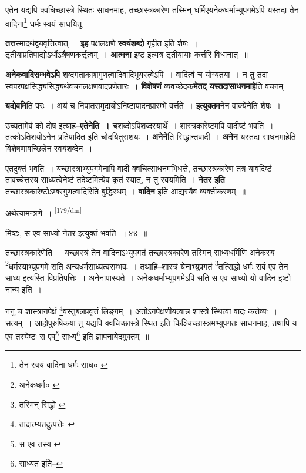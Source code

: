 \documentclass[article,12pt,a4paper]{memoir}
\begin{document}
	  \pstart एतेन यद्यपि क्वचिच्छास्त्रे स्थितः साधनमाह, तच्छास्त्रकारेण तस्मिन् धर्मिएयनेकधर्माभ्युपगमेऽपि यस्तदा तेन वादिना\footnote{तेन स्वयं वादिना धर्मः साध० \cite{dp-msC}} धर्मः स्वयं साधयितु-
	\pend
      

	  \pstart \textbf{तत्त}स्मादर्थद्वयवृत्तित्वात् । \textbf{इह} पक्षलक्षणे \textbf{स्वयंशब्दो} गृहीत इति शेषः । तृतीयाप्रतिपाद्योऽर्थोऽत्रैषणकर्त्तृत्वम् । \textbf{आत्मना} इष्ट इत्यत्र तृतीयायाः कर्त्तरि विधानात् ॥
	\pend
      

	  \pstart \textbf{अनेकवादिसम्भवेऽपि} शब्दगताकाशगुणत्वादिवादिभूयस्त्वेऽपि । वादित्वं च योग्यतया । न तु तदा स्वपरपक्षसिद्ध्यसिद्ध्यर्थवचनलक्षणवादप्रणेतारः । \textbf{विशेषणं} व्यवच्छेदक\textbf{मेतद् यस्तदासाधनमाहे}ति वचनम् ।
	\pend
      

	  \pstart \textbf{यद्येवमि}ति परः । अयं च निपातसमुदायोऽनिष्टापादनप्रारम्भे वर्त्तते । \textbf{इत्युक्तम}नेन वाक्येनेति शेषः ।
	\pend
      

	  \pstart उच्यतामेवं को दोष इत्याह--\textbf{एतेनेति । च}शब्दोऽपिशब्दस्यार्थे । शास्त्रकारेष्टमपि वादीष्टं भवति । तत्कोऽतिशयोऽनेन प्रतिपादित इति चोदयितुराशयः । \textbf{अनेने}ति सिद्धान्तवादी । \textbf{अनेन} यस्तदा साधनमाहेति विशेषणावच्छिन्नेन स्वयंशब्देन ।
	\pend
      

	  \pstart एतदुक्तं भवति । यच्छास्त्राभ्युपगमेनापि वादी क्वचित्साधनमभिधत्ते, तच्छास्त्रकारेण तत्र यावदिष्टं तावच्चेत्तस्य साध्यत्वेनेष्टं तदेष्टमित्येव कृतं स्यात्, न तु स्वयमिति । \textbf{नेतर इति} तच्छास्त्रकारेष्टोऽम्बरगुणत्वादिरिति बुद्धिस्थम् । \textbf{वादिन} इति आद्यस्यैव व्यक्तीकरणम् ॥
	\pend
      

	  \pstart अथेत्यामन्त्रणे ।
	\pend
      \leavevmode\textsuperscript{\rmlatinfont\tiny [179/dm]}

	  \pstart मिष्टः, स एव साध्यो नेतर इत्युक्तं भवति ॥ ४४ ॥
	\pend
       

	  \pstart तच्छास्त्रकारेणेति । यच्छास्त्रं तेन वादिनाऽभ्युपगतं तच्छास्त्रकारेण तस्मिन् साध्यधर्मिणि अनेकस्य \footnote{अनेकधर्म० \cite{dp-msC}}धर्मस्याभ्युपगमे सति अन्यधर्मसाध्यत्वसम्भवः । तथाहि--शास्त्रं येनाभ्युपगतं \footnote{तस्मिन् सिद्धो \cite{dp-edE}}तत्सिद्धो धर्मः सर्व एव तेन साध्य इत्यस्ति विप्रतिपत्तिः । अनेनापास्यते । अनेकधर्माभ्युपगमेऽपि सति स एव साध्यो यो वादिन इष्टो नान्य इति ।
	\pend
       

	  \pstart ननु च शास्त्रानपेक्षं \footnote{तादात्म्यतदुत्पत्तेः--\cite{dp-msD-n}}वस्तुबलप्रवृत्तं लिङ्गम् । अतोऽनपेक्षणीयत्वान्न शास्त्रे स्थित्वा वादः कर्त्तव्यः । सत्यम् । आहोपुरुषिकया तु यद्यपि क्वचिच्छास्त्रे स्थित इति किञ्चिच्छास्त्रमभ्युपगतः साधनमाह, तथापि य एव तस्येष्टः स एव\footnote{स एव तस्य \cite{dp-msA} \cite{dp-edE}} साध्य\footnote{साध्यत इति--\cite{dp-msC}} इति ज्ञापनायेदमुक्तम् ॥
	\pend
       
\end{document}
